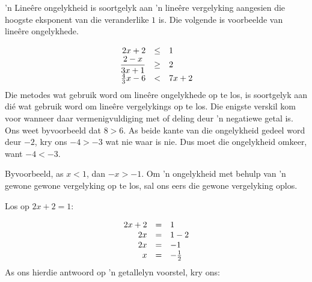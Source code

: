 


’n Lineêre ongelykheid is soortgelyk aan ’n lineêre vergelyking aangesien die hoogste eksponent van die veranderlike $1$ is. Die volgende is voorbeelde van lineêre ongelykhede.\par 

\begin{equation*}
\begin{array}{ccc}\hfill 2x+2& \leq& 1\hfill \\ \hfill \dfrac{2-x}{3x+1}&\geq& 2\hfill \\ \hfill \frac{4}{3}x-6&<& 7x+2\hfill \end{array}
\end{equation*}
Die metodes wat gebruik word om lineêre ongelykhede op te los, is soortgelyk aan dié wat gebruik word om
lineêre vergelykings op te los. Die enigste verskil kom voor wanneer daar vermenigvuldiging met of deling deur ’n negatiewe getal is. Ons weet byvoorbeeld dat
$8>6$. As beide kante van die ongelykheid gedeel word deur $-2$, kry ons $-4 > -3$ wat nie waar is nie. Dus moet die ongelykheid omkeer, want $-4<-3$.



Byvoorbeeld, as  $x<1$, dan $-x>-1$.
Om ’n ongelykheid met behulp van 'n gewone gewone vergelyking op te los, sal ons eers die gewone vergelyking oplos.\par
 Los op $2x+2=1$:

\begin{equation*}
\begin{array}{ccl}\hfill 2x+2& =& 1\hfill \\ \hfill 2x& =& 1-2\hfill \\ \hfill 2x& =& -1\hfill \\ \hfill x& =& -\frac{1}{2}\hfill \end{array}
\end{equation*}
As ons hierdie antwoord op ’n getallelyn voorstel, kry ons:\par 

